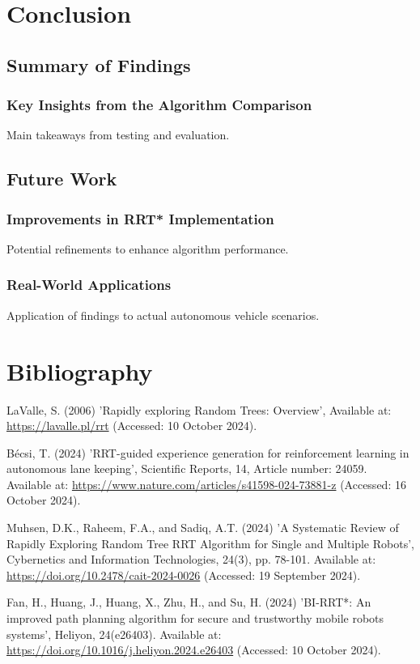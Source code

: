 \documentclass[a4paper,12pt]{report}
\begin{document}
\newpage

\chapter{Conclusion}
\section{Summary of Findings}
\subsection{Key Insights from the Algorithm Comparison}
Main takeaways from testing and evaluation.

\section{Future Work}
\subsection{Improvements in RRT* Implementation}
Potential refinements to enhance algorithm performance.

\subsection{Real-World Applications}
Application of findings to actual autonomous vehicle scenarios.

\newpage

\chapter{Bibliography}

\begin{thebibliography}{4}

     LaValle, S. (2006) 'Rapidly exploring Random Trees: Overview', Available at: \url{https://lavalle.pl/rrt} (Accessed: 10 October 2024).
    
     Bécsi, T. (2024) 'RRT-guided experience generation for reinforcement learning in autonomous lane keeping', Scientific Reports, 14, Article number: 24059. Available at: \url{https://www.nature.com/articles/s41598-024-73881-z} (Accessed: 16 October 2024).
    
     Muhsen, D.K., Raheem, F.A., and Sadiq, A.T. (2024) 'A Systematic Review of Rapidly Exploring Random Tree RRT Algorithm for Single and Multiple Robots', Cybernetics and Information Technologies, 24(3), pp. 78-101. Available at: \url{https://doi.org/10.2478/cait-2024-0026} (Accessed: 19 September 2024).
    
     Fan, H., Huang, J., Huang, X., Zhu, H., and Su, H. (2024) 'BI-RRT*: An improved path planning algorithm for secure and trustworthy mobile robots systems', Heliyon, 24(e26403). Available at: \url{https://doi.org/10.1016/j.heliyon.2024.e26403} (Accessed: 10 October 2024).
    
\end{thebibliography}
\end{document}
